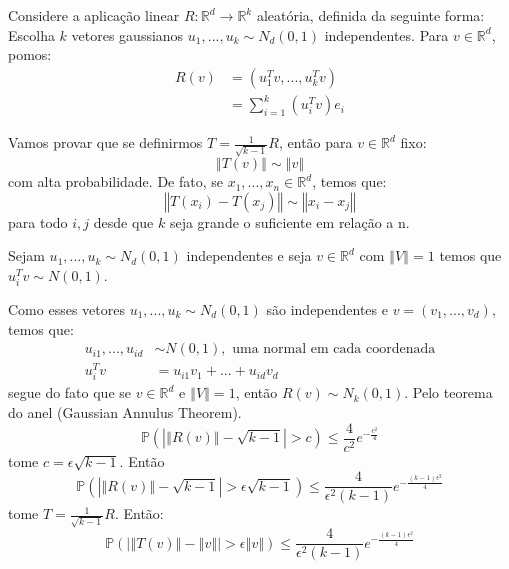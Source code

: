 Considere a aplicação linear $R \colon \mathbb{R}^d \to \mathbb{R}^k$ aleatória, definida da seguinte forma: Escolha $k$ vetores gaussianos $u_1,...,u_k \sim N_d(0,1)$ independentes. Para $v \in \mathbb{R}^d$, pomos:
\begin{equation*}
    \begin{split}
    R(v) &= (u_1^Tv,...,u_k^Tv)\\
         &= \sum\limits_{i=1}^k (u_i^Tv)e_i
    \end{split}
\end{equation*}

Vamos provar que se definirmos $T = \frac{1}{\sqrt{k-1}}R$, então para $v \in \mathbb{R}^d$ fixo:
\begin{equation*}
    \left\Vert T(v) \right\Vert \sim \left\Vert v \right\Vert
\end{equation*}
com alta probabilidade. De fato, se $x_1,...,x_n\in \mathbb{R}^d$, temos que:
\begin{equation*}
    \left\Vert T(x_i) - T(x_j) \right\Vert \sim \left\Vert x_i - x_j \right\Vert
\end{equation*}
para todo $i,j$ desde que $k$ seja grande o suficiente em relação a n.
\begin{fato}
Sejam $u_1,...,u_k \sim N_d(0,1)$ independentes e seja $v \in \mathbb{R}^d$ com $\left\Vert V \right\Vert = 1$ temos que $u_i^Tv \sim N(0,1)$.
\end{fato}
Como esses vetores $u_1,...,u_k \sim N_d(0,1)$ são independentes e $v = (v_1,...,v_d)$, temos que:
\begin{align*}
    u_{i1},...,u_{id} &\sim N(0,1), \text{ uma normal em cada coordenada}\\
    u^T_iv &= u_{i1}v_1 +...+u_{id}v_d
\end{align*}
segue do fato que se $v \in \mathbb{R}^d$ e $\left\Vert V \right\Vert = 1$, então $R(v) \sim N_k(0,1)$. Pelo teorema do anel (Gaussian Annulus Theorem).
\begin{equation*}
    \mathbb{P}\left(\left\vert \left\Vert R(v) \right\Vert - \sqrt{k-1} \right\vert > c\right) \leq \frac{4}{c^2}e^{-\frac{c^2}{4}}
\end{equation*}
tome $c = \epsilon\sqrt{k-1}$. Então
\begin{equation*}
    \mathbb{P}(\left\vert \left\Vert R(v) \right\Vert - \sqrt{k-1} \right\vert > \epsilon\sqrt{k-1}) \leq \frac{4}{\epsilon^2(k-1)}e^{-\frac{(k-1)\epsilon^2}{4}}
\end{equation*}
tome $T=\frac{1}{\sqrt{k-1}}R$. Então:
\begin{equation*}
    \mathbb{P}(\left\vert \left\Vert T(v) \right\Vert - \left\Vert v \right\Vert \right\vert > \epsilon\left\Vert v \right\Vert) \leq \frac{4}{\epsilon^2(k-1)}e^{-\frac{(k-1)\epsilon^2}{4}}
\end{equation*}

